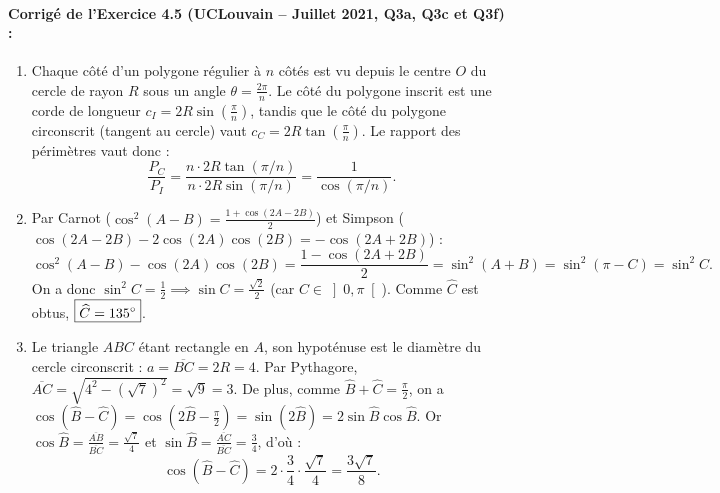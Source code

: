 \paragraph{Corrigé de l'Exercice 4.5 (UCLouvain -- Juillet 2021, Q3a, Q3c et Q3f) :}
\begin{enumerate}[label=(\alph*)]
    \item Chaque côté d'un polygone régulier à $n$ côtés est vu depuis le centre $O$ du cercle de rayon $R$ sous un angle $\theta = \frac{2\pi}{n}$. Le côté du polygone inscrit est une corde de longueur $c_I = 2R\sin\left(\frac{\pi}{n}\right)$, tandis que le côté du polygone circonscrit (tangent au cercle) vaut $c_C = 2R\tan\left(\frac{\pi}{n}\right)$. Le rapport des périmètres vaut donc :
    \[
        \frac{P_C}{P_I} = \frac{n \cdot 2R\tan(\pi/n)}{n \cdot 2R\sin(\pi/n)} = \boxed{\frac{1}{\cos(\pi/n)}}.
    \]
    \item Par Carnot ($\cos^2(A-B) = \frac{1+\cos(2A-2B)}{2}$) et Simpson ($\cos(2A-2B) - 2\cos(2A)\cos(2B) = -\cos(2A+2B)$) :
    \[
        \cos^2(A-B) - \cos(2A)\cos(2B) = \frac{1 - \cos(2A+2B)}{2} = \sin^2(A+B) = \sin^2(\pi - C) = \sin^2 C.
    \]
    On a donc $\sin^2 C = \frac{1}{2} \implies \sin C = \frac{\sqrt{2}}{2}$ (car $C \in \left]0, \pi\right[$). Comme $\widehat{C}$ est obtus, $\boxed{\widehat{C} = 135\degree}$.
    \item Le triangle $ABC$ étant rectangle en $A$, son hypoténuse est le diamètre du cercle circonscrit : $a = \overline{BC} = 2R = 4$. Par Pythagore, $\overline{AC} = \sqrt{4^2 - (\sqrt{7})^2} = \sqrt{9} = 3$. De plus, comme $\widehat{B} + \widehat{C} = \frac{\pi}{2}$, on a $\cos(\widehat{B}-\widehat{C}) = \cos\left(2\widehat{B} - \frac{\pi}{2}\right) = \sin(2\widehat{B}) = 2\sin\widehat{B}\cos\widehat{B}$. Or $\cos\widehat{B} = \frac{\overline{AB}}{\overline{BC}} = \frac{\sqrt{7}}{4}$ et $\sin\widehat{B} = \frac{\overline{AC}}{\overline{BC}} = \frac{3}{4}$, d'où :
    \[
        \cos(\widehat{B} - \widehat{C}) = 2 \cdot \frac{3}{4} \cdot \frac{\sqrt{7}}{4} = \boxed{\frac{3\sqrt{7}}{8}}.
    \]
\end{enumerate}

